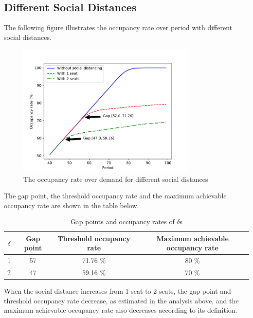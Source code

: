 
\subsection*{Different Social Distances}
The following figure illustrates the occupancy rate over period with different social distances.

\begin{figure}[h]
  \centering
    \includegraphics[width=0.8\textwidth]{./Figures/distance.pdf}
  \caption{The occupancy rate over demand for different social distances}
\end{figure}

The gap point, the threshold occupancy rate and the maximum achievable occupancy rate are shown in the
table below.

\begin{table}[ht]
  \centering
  \caption{Gap points and occupancy rates of $\delta$s}
  \begin{tabular}{c|ccc}
  \hline
   $\delta$  & Gap point & Threshold occupancy rate & Maximum achievable occupancy rate \\
  \hline
   1 &  57  & 71.76 \% & 80 \% \\
   2 &  47  & 59.16 \% & 70 \% \\
   \hline
  \end{tabular}
\end{table}

When the social distance increases from 1 seat to 2 seats, the gap point and threshold occupancy rate decrease, as estimated in the analysis above, and the maximum achievable occupancy rate also decreases according to its definition.